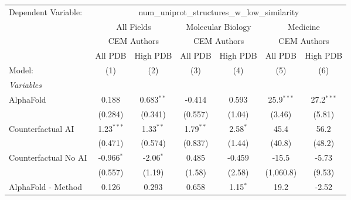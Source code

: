 \begingroup
\centering
\begin{tabular}{lcccccc}
   \tabularnewline \midrule \midrule
   Dependent Variable: & \multicolumn{6}{c}{num\_uniprot\_structures\_w\_low\_similarity}\\
 & \multicolumn{2}{c}{All Fields} & \multicolumn{2}{c}{Molecular Biology} & \multicolumn{2}{c}{Medicine} \\
\cmidrule(lr){2-3} \cmidrule(lr){4-5} \cmidrule(lr){6-7}
 & \multicolumn{2}{c}{CEM Authors} & \multicolumn{2}{c}{CEM Authors} & \multicolumn{2}{c}{CEM Authors} \\
\cmidrule(lr){2-3} \cmidrule(lr){4-5} \cmidrule(lr){6-7}
 & \multicolumn{1}{c}{All PDB} & \multicolumn{1}{c}{High PDB} & \multicolumn{1}{c}{All PDB} & \multicolumn{1}{c}{High PDB} & \multicolumn{1}{c}{All PDB} & \multicolumn{1}{c}{High PDB} \\
\cmidrule(lr){2-2} \cmidrule(lr){3-3} \cmidrule(lr){4-4} \cmidrule(lr){5-5} \cmidrule(lr){6-6} \cmidrule(lr){7-7}
   Model:                                                     & (1)           & (2)           & (3)           & (4)           & (5)            & (6)\\  
   \midrule
   \emph{Variables}\\
   AlphaFold                                                  & 0.188         & 0.683$^{**}$  & -0.414        & 0.593         & 25.9$^{***}$   & 27.2$^{***}$\\   
                                                              & (0.284)       & (0.341)       & (0.557)       & (1.04)        & (3.46)         & (5.81)\\   
   Counterfactual AI                                          & 1.23$^{***}$  & 1.33$^{**}$   & 1.79$^{**}$   & 2.58$^{*}$    & 45.4           & 56.2\\   
                                                              & (0.471)       & (0.574)       & (0.837)       & (1.44)        & (40.8)         & (48.2)\\   
   Counterfactual No AI                                       & -0.966$^{*}$  & -2.06$^{*}$   & 0.485         & -0.459        & -15.5          & -5.73\\   
                                                              & (0.557)       & (1.19)        & (1.58)        & (2.58)        & (1,060.8)      & (9.53)\\   
   AlphaFold - Method                                         & 0.126         & 0.293         & 0.658         & 1.15$^{*}$    & 19.2           & -2.52\\   

\end{tabular}
